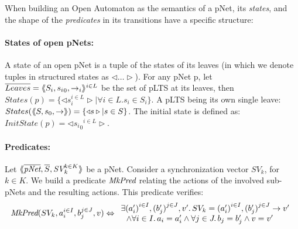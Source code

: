 \documentclass{lncs/llncs}
\newcommand{\TODO}[1]{\textcolor{red}{\textbf{[TODO:#1]}}}
\newcommand{\MkPred}{\symb{MkPred}}
\begin{document}
When building an Open Automaton as the semantics of a pNet, its
\emph{states}, and the shape of the \emph{predicates} in its
transitions have a specific structure:

\paragraph{States of open pNets:}\label{def-states}
  A state of an open pNet is a tuple of the
  states of its leaves (in which we denote tuples
  in structured states as $\triangleleft\ldots\triangleright$).
  For any pNet p, let $\overline{Leaves} = \langle\hspace{-0.58ex}\langle S_i,{s_i}_0, \to_i\rangle\hspace{-0.58ex}\rangle^{i \in L}$ be the set of pLTS at its leaves,
  then $States(p) = \{\triangleleft s_i^{i\in L}
  \triangleright| \forall i\in L. s_i \in S_i\}$.
A pLTS being its own single leave:
  $States(\langle\hspace{-0.58ex}\langle S,s_0, \to\rangle\hspace{-0.58ex}\rangle) = \{\triangleleft s \triangleright| s \in S\}$.
The initial state is defined as:
$InitState(p) = \triangleleft {{s_i}_0}^{i\in L}  \triangleright$.



\paragraph{Predicates:}
Let
$\mylangle\overline{\pNet},\overline{S},\symb{SV}_k^{k\in K} \myrangle$
be a pNet. Consider a synchronization vector $SV_k$, for $k\in K$. We build a
predicate $\MkPred$ relating
the actions of the involved sub-pNets and the resulting actions. This predicate verifies:
\[\MkPred(SV_k, a_i^{i\in I}, b_j^{j\in J}, v)\Leftrightarrow
\begin{array}{l}
\exists {(a'_i)}^{i\in I},
{(b'_j)}^{j\in J},v'.\, SV_k={(a'_i)}^{i\in I}, {(b'_j)}^{j\in J}\rightarrow v'
\\~~\land
\forall i\in I.\, a_i=a'_i\land \forall j \in J.\, b_j=b'_j \land v=v'
\end{array}\]

\end{document}
